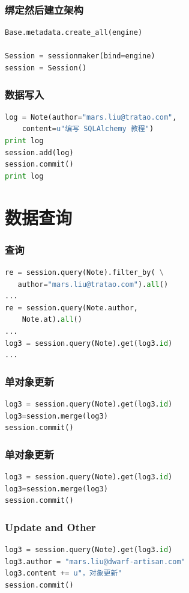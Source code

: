 \documentclass{beamer}
\begin{document}
\begin{frame}[containsverbatim]
  \frametitle{绑定然后建立架构}
  \begin{lstlisting}[language=python]
Base.metadata.create_all(engine)

Session = sessionmaker(bind=engine)
session = Session()
  \end{lstlisting}
\end{frame}

\begin{frame}[containsverbatim]
  \frametitle{数据写入}
  \begin{lstlisting}[language=python]
log = Note(author="mars.liu@tratao.com", 
    content=u"编写 SQLAlchemy 教程")
print log
session.add(log)
session.commit()
print log
  \end{lstlisting}
\end{frame}

\section{数据查询}
\begin{frame}[containsverbatim]
  \frametitle{查询}
  \begin{lstlisting}[language=python]
re = session.query(Note).filter_by( \
   author="mars.liu@tratao.com").all()
...
re = session.query(Note.author, 
    Note.at).all()
...
log3 = session.query(Note).get(log3.id)
...
  \end{lstlisting}
\end{frame}

\begin{frame}[containsverbatim]
  \frametitle{单对象更新}
  \begin{lstlisting}[language=python]
log3 = session.query(Note).get(log3.id)
log3=session.merge(log3)
session.commit()
  \end{lstlisting}
\end{frame}

\begin{frame}[containsverbatim]
  \frametitle{单对象更新}
  \begin{lstlisting}[language=python]
log3 = session.query(Note).get(log3.id)
log3=session.merge(log3)
session.commit()
  \end{lstlisting}
\end{frame}

\begin{frame}[containsverbatim]
  \frametitle{Update and Other}
  \begin{lstlisting}[language=python]
log3 = session.query(Note).get(log3.id)
log3.author = "mars.liu@dwarf-artisan.com"
log3.content += u"，对象更新"
session.commit()
  \end{lstlisting}
\end{frame}
\end{document}
